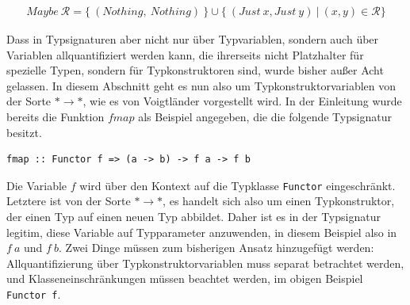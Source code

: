 \begin{align*}
Maybe\ \mathcal{R} = \{~(Nothing,\ Nothing)~\} \cup \{~(Just\ x, Just\ y)~|~(x, y) \in \mathcal{R} \}
\end{align*}

Dass in Typsignaturen aber nicht nur über Typvariablen, sondern auch über Variablen allquantifiziert werden kann, die
ihrerseits nicht Platzhalter für spezielle Typen, sondern für Typkonstruktoren sind, wurde bisher außer Acht gelassen. In diesem
Abschnitt geht es nun also um Typkonstruktorvariablen von der Sorte $* \rightarrow *$, wie es von Voigtländer \cite{voigtlander}
vorgestellt wird. In der Einleitung wurde bereits die Funktion $fmap$ als Beispiel angegeben, die die folgende Typsignatur besitzt.



\begin{verbatim}
fmap :: Functor f => (a -> b) -> f a -> f b
\end{verbatim}

Die Variable $f$ wird über den Kontext auf die Typklasse \texttt{Functor} eingeschränkt. Letztere ist von der Sorte $* \rightarrow *$,
es handelt sich also um einen Typkonstruktor, der einen Typ auf einen neuen Typ abbildet.
Daher ist es in der Typsignatur legitim, diese Variable auf Typparameter anzuwenden, in diesem Beispiel also in $f\ a$ und $f\ b$.
Zwei Dinge müssen zum bisherigen Ansatz hinzugefügt werden: Allquantifizierung über Typkonstruktorvariablen muss separat betrachtet werden,
und Klasseneinschränkungen müssen beachtet werden, im obigen Beispiel \texttt{Functor\ f}.

